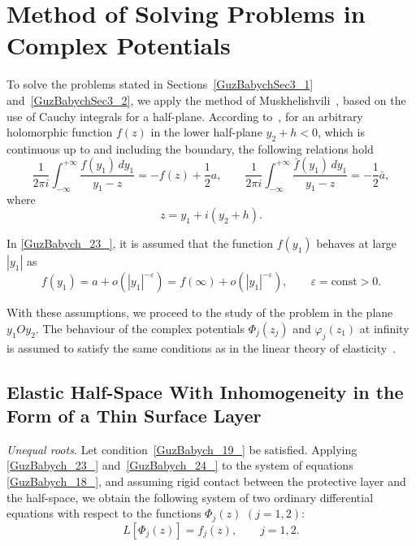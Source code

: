 \section{Method of Solving Problems in Complex Potentials}

To solve the problems stated in Sections~\ref{GuzBabychSec3_1} and~\ref{GuzBabychSec3_2}, we apply the method of Muskhelishvili~\cite{GuzBabych13}, based on the use of Cauchy integrals for a half-plane. According to~\cite{GuzBabych13}, for an arbitrary holomorphic function $f(z)$ in the lower half-plane $y_{2}+h<0$, which is continuous up to and including the boundary, the following relations hold
\begin{equation}
	\label{GuzBabych_23_}
	\frac{1}{2\pi i}\int_{-\infty}^{+\infty}\frac{f(y_{1})\,dy_{1}}{y_{1}-z}
	=
	-f(z)+\frac{1}{2}a,
	\qquad
	\frac{1}{2\pi i}\int_{-\infty}^{+\infty}\frac{\bar{f}(y_{1})\,dy_{1}}{y_{1}-z}
	=
	-\frac{1}{2}\bar{a},
\end{equation}
where
\[
z = y_{1}+i(y_{2}+h).
\]

In \eqref{GuzBabych_23_}, it is assumed that the function $f(y_{1})$ behaves at large $|y_{1}|$ as
\begin{equation}
	\label{GuzBabych_24_}
	f(y_{1})
	=
	a+o(|y_{1}|^{-\varepsilon})
	=
	f(\infty)+o(|y_{1}|^{-\varepsilon}),
	\qquad
	\varepsilon=\mathrm{const}>0 .
\end{equation}

With these assumptions, we proceed to the study of the problem in the plane $y_{1}Oy_{2}$. The behaviour of the complex potentials $\Phi_{j}(z_{j})$ and $\varphi_{j}(z_{1})$ at infinity is assumed to satisfy the same conditions as in the linear theory of elasticity~\cite{GuzBabych12,GuzBabych13}.

\subsection{Elastic Half-Space With Inhomogeneity in the Form of a Thin Surface Layer}

\medskip\emph{Unequal roots.} Let condition~\eqref{GuzBabych_19_} be satisfied. Applying \eqref{GuzBabych_23_} and~\eqref{GuzBabych_24_} to the system of equations \eqref{GuzBabych_18_}, and assuming rigid contact between the protective layer and the half-space, we obtain the following system of two ordinary differential equations with respect to the functions $\Phi_j(z)$ $(j=1,2)$:
\begin{equation}
	\label{GuzBabych_25_}
	L[\Phi_j(z)] = f_j(z), \qquad j=1,2 .
\end{equation}

